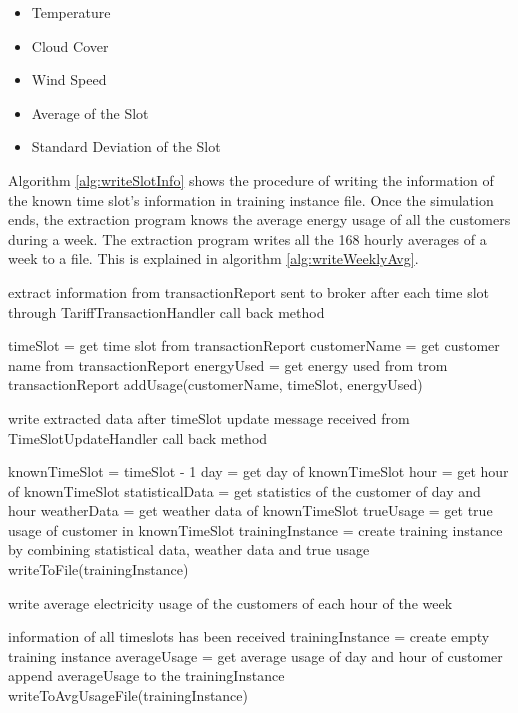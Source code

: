 \begin{itemize}
  \item Temperature
  \item Cloud Cover
  \item Wind Speed
  \item Average of the Slot
  \item Standard Deviation of the Slot
\end{itemize}

Algorithm \ref{alg:writeSlotInfo} shows the procedure of writing the information of the known time slot's information in training instance file. Once the simulation ends, the extraction program knows the average energy usage of all the customers during a week. The extraction program writes all the 168 hourly averages of a week to a file. This is explained in algorithm \ref{alg:writeWeeklyAvg}. 

\begin{algorithm}[!h]
\caption{extract information from transactionReport sent to broker after each time slot through TariffTransactionHandler call back method}
\begin{algorithmic} [1]
\STATE timeSlot = get time slot from transactionReport
\STATE customerName = get customer name from transactionReport
\STATE energyUsed = get energy used from trom transactionReport
\STATE addUsage(customerName, timeSlot, energyUsed)
\end{algorithmic}
 \label{alg:ttxHandle}
\end{algorithm}

\begin{algorithm} [!h]
\caption{write extracted data after timeSlot update message received from TimeSlotUpdateHandler call back method}
\begin{algorithmic} [1]
\STATE knownTimeSlot = timeSlot - 1
\STATE day = get day of knownTimeSlot
\STATE hour = get hour of knownTimeSlot
\STATE statisticalData = get statistics of the customer of day and hour
\STATE weatherData = get weather data of knownTimeSlot
\STATE trueUsage = get true usage of customer in knownTimeSlot
\STATE trainingInstance = create training instance by combining statistical data, weather data and true usage 
\STATE writeToFile(trainingInstance)
\ENDFOR
\end{algorithmic}
\label{alg:writeSlotInfo}
\end{algorithm}

\begin{algorithm} [!h]
\caption{write average electricity usage of the customers of each hour of the week}
\begin{algorithmic} [1]
\REQUIRE information of all timeslots has been received
    \STATE trainingInstance = create empty training instance
            \STATE averageUsage = get average usage of day and hour of customer
            \STATE append averageUsage to the trainingInstance
        \ENDFOR
    \ENDFOR
    \STATE writeToAvgUsageFile(trainingInstance)
\ENDFOR
\end{algorithmic}
\label{alg:writeWeeklyAvg}
\end{algorithm}


